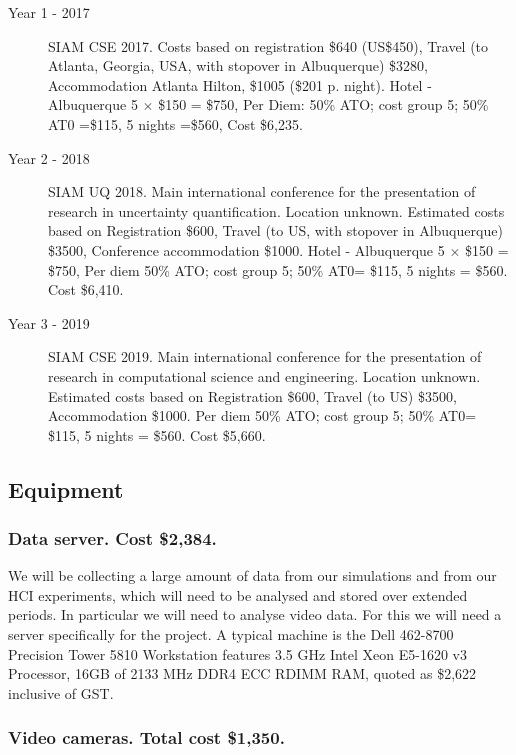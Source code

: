 \documentclass[a4paper,fontsize=12pt]{scrartcl}
\begin{document}
\begin{description}
\item[Year 1 - 2017] SIAM CSE 2017.
Costs based on registration \$640 (US\$450), 
Travel (to Atlanta, Georgia, USA, with stopover in Albuquerque) \$3280, 
Accommodation Atlanta Hilton, \$1005 (\$201 p. night).  
Hotel - Albuquerque 5 $\times$  \$150 = \$750,
Per Diem: 50\% ATO; cost group 5; 50\% AT0 =\$115, 5 nights =\$560, Cost \$6,235.

\item[Year 2 - 2018] SIAM UQ 2018.
Main international conference for the presentation of research in uncertainty quantification. Location unknown.
Estimated costs based on 
Registration \$600,
Travel (to US, with stopover in Albuquerque) \$3500, 
Conference accommodation \$1000.
Hotel - Albuquerque 5 $\times$  \$150 = \$750,
Per diem 50\% ATO; cost group 5; 50\% AT0= \$115, 5 nights = \$560. Cost \$6,410.

\item[Year 3 - 2019]  SIAM CSE 2019.
Main international conference for the presentation of research in computational science and engineering. Location unknown.
Estimated costs based on 
Registration \$600,
Travel (to US) \$3500, 
Accommodation \$1000.
Per diem 50\% ATO; cost group 5; 50\% AT0= \$115, 5 nights = \$560. Cost \$5,660.

\end{description}

\subsection*{Equipment}

\subsubsection*{Data server. Cost \$2,384.}

We will be collecting a large amount of data from our simulations and from our HCI experiments, which will need to be analysed and stored over extended periods. In particular we will need to analyse video data.  For this we will need a server specifically for the project. A typical machine is the Dell 462-8700 Precision Tower 5810 Workstation features 3.5 GHz Intel Xeon E5-1620 v3 Processor, 16GB of 2133 MHz DDR4 ECC RDIMM RAM, quoted as \$2,622 inclusive of GST.  


\subsubsection*{Video cameras. Total cost \$1,350.}
\end{document}
